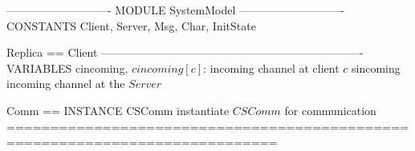 \documentclass{article}
\begin{document}
\begin{tla}
---------------------------- MODULE SystemModel ----------------------------
CONSTANTS Client, Server, Msg, Char, InitState

Replica == Client 
----------------------------------------------------------------------
VARIABLES cincoming,  \* $cincoming[c]$: incoming channel at client $c$ 
          sincoming   \* incoming channel at the $Server$

Comm == INSTANCE CSComm \* instantiate $CSComm$ for communication
=============================================================================
\end{tla}
\end{document}
